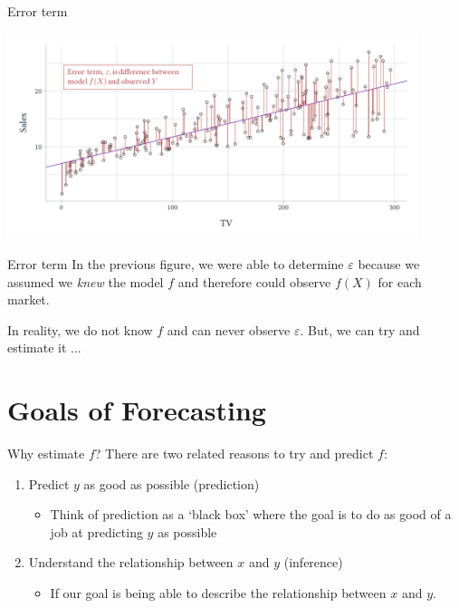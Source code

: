 \documentclass[aspectratio=169,t,11pt,table]{beamer}
\begin{document}
\begin{frame}{Error term}
  \begin{center}
    \includegraphics[width=0.9\textwidth]{figures/sales_tv_error_term.pdf}
  \end{center}
\end{frame}

\begin{frame}{Error term}
  In the previous figure, we were able to determine $\varepsilon$ because we assumed we \emph{knew} the model $f$ and therefore could observe $f(X)$ for each market.

  \bigskip
  In reality, we do not know $f$ and can never observe $\varepsilon$. But, we can try and estimate it ...
\end{frame}

\section{Goals of Forecasting}

\begin{frame}{Why estimate $f$?}
  There are two related reasons to try and predict $f$:
  \begin{enumerate}
    \item Predict $y$ as good as possible (\alert{prediction})
    \begin{itemize}
      \item Think of prediction as a `black box' where the goal is to do as good of a job at predicting $y$ as possible
    \end{itemize}
    
    \item Understand the relationship between $x$ and $y$ (\alert{inference})
    \begin{itemize}
      \item If our goal is being able to describe the relationship between $x$ and $y$.
    \end{itemize}
  \end{enumerate}
\end{frame}
\end{document}
